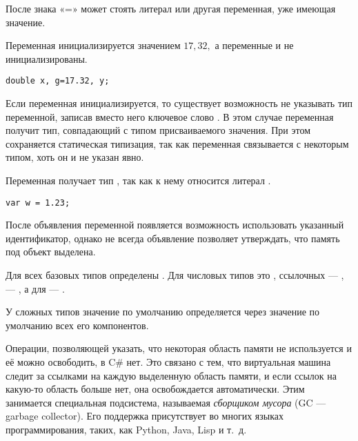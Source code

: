 \begin{center}
  \par
\end{center}

После знака «=» может стоять литерал или другая переменная, уже имеющая
значение.

\begin{example}
  Переменная  инициализируется значением $17{,}32,$ а
  переменные  и  не инициализированы.

\begin{lstlisting}
double x, g=17.32, y;
\end{lstlisting}
\end{example}

Если переменная инициализируется, то существует возможность не
указывать тип переменной, записав вместо него ключевое слово
. В этом случае переменная получит тип, совпадающий с
типом присваиваемого значения. При этом сохраняется статическая
типизация, так как переменная связывается с некоторым типом, хоть он и
не указан явно.

\begin{example}
  Переменная  получает тип , так как к нему
  относится литерал .
  
\begin{lstlisting}
var w = 1.23;
\end{lstlisting}
\end{example}

После объявления переменной появляется возможность использовать
указанный идентификатор, однако не всегда объявление позволяет
утверждать, что память под объект выделена.


Для всех базовых типов определены . Для числовых типов это ,
ссылочных — ,  — , а для  —
.

У сложных типов значение по умолчанию определяется через значение по
умолчанию всех его компонентов.


Операции, позволяющей указать, что некоторая область памяти не
используется и её можно освободить, в C\# нет. Это связано с тем, что
виртуальная машина следит за ссылками на каждую выделенную область
памяти, и если ссылок на какую-то область больше нет, она
освобождается автоматически.  Этим занимается специальная подсистема,
называемая \emph{сборщиком мусора} (GC — garbage collector). Его
поддержка присутствует во многих языках программирования, таких, как
Python, Java, Lisp и т.~д.

